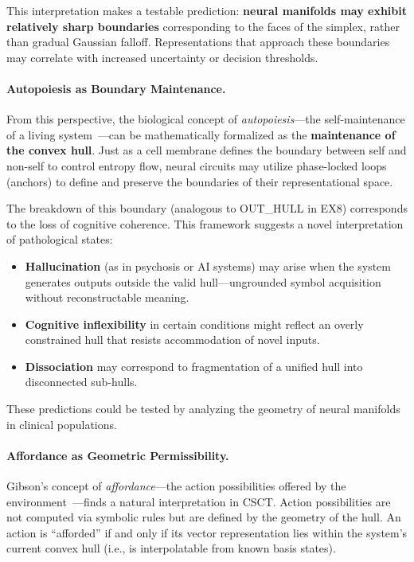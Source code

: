 \documentclass{article}
\begin{document}
This interpretation makes a testable prediction: \textbf{neural manifolds may exhibit relatively sharp boundaries} corresponding to the faces of the simplex, rather than gradual Gaussian falloff.
Representations that approach these boundaries may correlate with increased uncertainty or decision thresholds.

\paragraph{Autopoiesis as Boundary Maintenance.}
From this perspective, the biological concept of \textit{autopoiesis}---the self-maintenance of a living system~\cite{maturana1980autopoiesis}---can be mathematically formalized as the \textbf{maintenance of the convex hull}.
Just as a cell membrane defines the boundary between self and non-self to control entropy flow, neural circuits may utilize phase-locked loops (anchors) to define and preserve the boundaries of their representational space.

The breakdown of this boundary (analogous to OUT\_HULL in EX8) corresponds to the loss of cognitive coherence.
This framework suggests a novel interpretation of pathological states:
\begin{itemize}
    \item \textbf{Hallucination} (as in psychosis or AI systems) may arise when the system generates outputs outside the valid hull---ungrounded symbol acquisition without reconstructable meaning.
    \item \textbf{Cognitive inflexibility} in certain conditions might reflect an overly constrained hull that resists accommodation of novel inputs.
    \item \textbf{Dissociation} may correspond to fragmentation of a unified hull into disconnected sub-hulls.
\end{itemize}
These predictions could be tested by analyzing the geometry of neural manifolds in clinical populations.

\paragraph{Affordance as Geometric Permissibility.}
Gibson's concept of \textit{affordance}---the action possibilities offered by the environment~\cite{gibson1979ecological}---finds a natural interpretation in CSCT.
Action possibilities are not computed via symbolic rules but are defined by the geometry of the hull.
An action is ``afforded'' if and only if its vector representation lies within the system's current convex hull (i.e., is interpolatable from known basis states).
\end{document}
